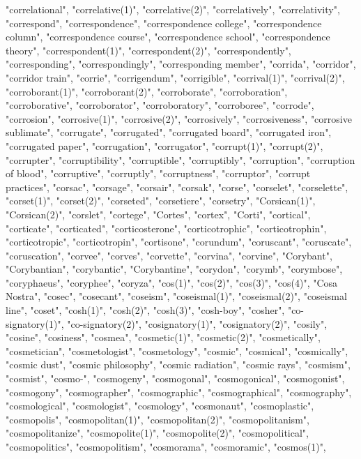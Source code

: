 "correlational",
"correlative(1)",
"correlative(2)",
"correlatively",
"correlativity",
"correspond",
"correspondence",
"correspondence college",
"correspondence column",
"correspondence course",
"correspondence school",
"correspondence theory",
"correspondent(1)",
"correspondent(2)",
"correspondently",
"corresponding",
"correspondingly",
"corresponding member",
"corrida",
"corridor",
"corridor train",
"corrie",
"corrigendum",
"corrigible",
"corrival(1)",
"corrival(2)",
"corroborant(1)",
"corroborant(2)",
"corroborate",
"corroboration",
"corroborative",
"corroborator",
"corroboratory",
"corroboree",
"corrode",
"corrosion",
"corrosive(1)",
"corrosive(2)",
"corrosively",
"corrosiveness",
"corrosive sublimate",
"corrugate",
"corrugated",
"corrugated board",
"corrugated iron",
"corrugated paper",
"corrugation",
"corrugator",
"corrupt(1)",
"corrupt(2)",
"corrupter",
"corruptibility",
"corruptible",
"corruptibly",
"corruption",
"corruption of blood",
"corruptive",
"corruptly",
"corruptness",
"corruptor",
"corrupt practices",
"corsac",
"corsage",
"corsair",
"corsak",
"corse",
"corselet",
"corselette",
"corset(1)",
"corset(2)",
"corseted",
"corsetiere",
"corsetry",
"Corsican(1)",
"Corsican(2)",
"corslet",
"cortege",
"Cortes",
"cortex",
"Corti",
"cortical",
"corticate",
"corticated",
"corticosterone",
"corticotrophic",
"corticotrophin",
"corticotropic",
"corticotropin",
"cortisone",
"corundum",
"coruscant",
"coruscate",
"coruscation",
"corvee",
"corves",
"corvette",
"corvina",
"corvine",
"Corybant",
"Corybantian",
"corybantic",
"Corybantine",
"corydon",
"corymb",
"corymbose",
"coryphaeus",
"coryphee",
"coryza",
"cos(1)",
"cos(2)",
"cos(3)",
"cos(4)",
"Cosa Nostra",
"cosec",
"cosecant",
"coseism",
"coseismal(1)",
"coseismal(2)",
"coseismal line",
"coset",
"cosh(1)",
"cosh(2)",
"cosh(3)",
"cosh-boy",
"cosher",
"co-signatory(1)",
"co-signatory(2)",
"cosignatory(1)",
"cosignatory(2)",
"cosily",
"cosine",
"cosiness",
"cosmea",
"cosmetic(1)",
"cosmetic(2)",
"cosmetically",
"cosmetician",
"cosmetologist",
"cosmetology",
"cosmic",
"cosmical",
"cosmically",
"cosmic dust",
"cosmic philosophy",
"cosmic radiation",
"cosmic rays",
"cosmism",
"cosmist",
"cosmo-",
"cosmogeny",
"cosmogonal",
"cosmogonical",
"cosmogonist",
"cosmogony",
"cosmographer",
"cosmographic",
"cosmographical",
"cosmography",
"cosmological",
"cosmologist",
"cosmology",
"cosmonaut",
"cosmoplastic",
"cosmopolis",
"cosmopolitan(1)",
"cosmopolitan(2)",
"cosmopolitanism",
"cosmopolitanize",
"cosmopolite(1)",
"cosmopolite(2)",
"cosmopolitical",
"cosmopolitics",
"cosmopolitism",
"cosmorama",
"cosmoramic",
"cosmos(1)",
